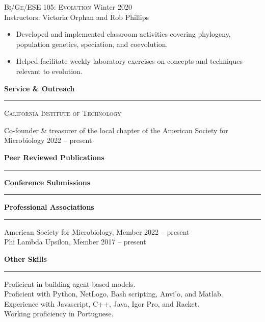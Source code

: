 \documentclass{article}
\newcommand{\cvsection}[1]{%
	{\large \textbf{#1\phantom{,}}}
	\hrule
}
\begin{document}
\medskip

\textsc{Bi/Ge/ESE 105: Evolution} \hfill Winter 2020\\
Instructors: Victoria Orphan and Rob Phillips
\begin{itemize}[leftmargin=1.5em, nosep, label=$\vcenter{\hbox{\tiny\textbullet}}$]
\item
Developed and implemented classroom activities covering phylogeny, population genetics,
speciation, and coevolution.
\item
Helped facilitate weekly laboratory exercises on concepts and techniques relevant to evolution.
\end{itemize}

\bigskip


\cvsection{Service \& Outreach}
\bigskip

{\large \textsc{California Institute of Technology}}
\medskip

Co-founder \& treasurer of the local chapter of the American Society for Microbiology \hfill 2022 -- present

\bigskip

\cvsection{Peer Reviewed Publications}

\printbibliography[type=article,heading=none,resetnumbers=true]

\cvsection{Conference Submissions}

\printbibliography[type=inproceedings,heading=none,resetnumbers=true]

\cvsection{Professional Associations}
\bigskip

American Society for Microbiology, Member \hfill 2022 -- present\\
Phi Lambda Upsilon, Member	\hfill	2017 -- present

\bigskip

\cvsection{Other Skills}
\bigskip

Proficient in building agent-based models.\\
Proficient with Python, NetLogo, Bash scripting, Anvi'o, and Matlab.\\
Experience with Javascript, C++,  Java, Igor Pro, and Racket.\\
Working proficiency in Portuguese.
\end{document}
